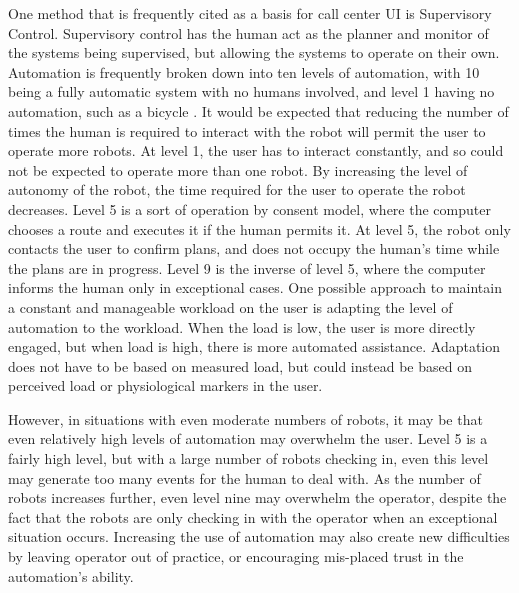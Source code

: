 \documentclass[]{article}
\begin{document}
One method that is frequently cited as a basis for call center UI is Supervisory Control. 
Supervisory control has the human act as the planner and monitor of the systems being supervised, but allowing the systems to operate on their own.
Automation is frequently broken down into ten levels of automation, with 10 being a fully automatic system with no humans involved, and level 1 having no automation, such as a bicycle \cite{parasuraman2000model}. 
It would be expected that reducing the number of times the human is required to interact with the robot will permit the user to operate more robots.
At level 1, the user has to interact constantly, and so could not be expected to operate more than one robot. 
By increasing the level of autonomy of the robot, the time required for the user to operate the robot decreases.  
Level 5 is a sort of operation by consent model, where the computer chooses a route and executes it if the human permits it. 
At level 5, the robot only contacts the user to confirm plans, and does not occupy the human's time while the plans are in progress. 
Level 9 is the inverse of level 5, where the computer informs the human only in exceptional cases. 
One possible approach to maintain a constant and manageable workload on the user is adapting the level of automation to the workload. 
When the load is low, the user is more directly engaged, but when load is high, there is more automated assistance. 
Adaptation does not have to be based on measured load, but could instead be based on perceived load or physiological markers in the user. 

However, in situations with even moderate numbers of robots, it may be that even relatively high levels of automation may overwhelm the user. 
Level 5 is a fairly high level, but with a large number of robots checking in, even this level may generate too many events for the human to deal with. 
As the number of robots increases further, even level nine may overwhelm the operator, despite the fact that the robots are only checking in with the operator when an exceptional situation occurs. 
Increasing the use of automation may also create new difficulties by leaving operator out of practice, or encouraging mis-placed trust in the automation's ability. 
\end{document}
